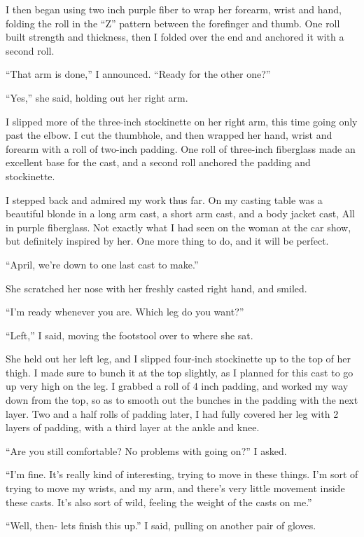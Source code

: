 I then began using two inch purple fiber to wrap her forearm, wrist and hand, folding the roll
in the ``Z'' pattern between the forefinger and thumb. One roll built strength and thickness,
then I folded over the end and anchored it with a second roll.

``That arm is done,'' I announced. ``Ready for the other one?''

``Yes,'' she said, holding out her right arm.

I slipped more of the three-inch stockinette on her right arm, this time going only past the
elbow. I cut the thumbhole, and then wrapped her hand, wrist and forearm with a roll of two-inch
padding. One roll of three-inch fiberglass made an excellent base for the cast, and a second
roll anchored the padding and stockinette.

I stepped back and admired my work thus far. On my casting table was a beautiful blonde in a
long arm cast, a short arm cast, and a body jacket cast, All in purple fiberglass. Not exactly
what I had seen on the woman at the car show, but definitely inspired by her. One more thing to
do, and it will be perfect.

``April, we're down to one last cast to make.''

She scratched her nose with her freshly casted right hand, and smiled.

``I'm ready whenever you are. Which leg do you want?''

``Left,'' I said, moving the footstool over to where she sat.

She held out her left leg, and I slipped four-inch stockinette up to the top of her thigh. I
made sure to bunch it at the top slightly, as I planned for this cast to go up very high on the
leg. I grabbed a roll of 4 inch padding, and worked my way down from the top, so as to smooth
out the bunches in the padding with the next layer. Two and a half rolls of padding later, I had
fully covered her leg with 2 layers of padding, with a third layer at the ankle and knee.

``Are you still comfortable? No problems with going on?'' I asked.

``I'm fine. It's really kind of interesting, trying to move in these things. I'm sort of trying
to move my wrists, and my arm, and there's very little movement inside these casts. It's also
sort of wild, feeling the weight of the casts on me.''

``Well, then- lets finish this up.'' I said, pulling on another pair of gloves.

